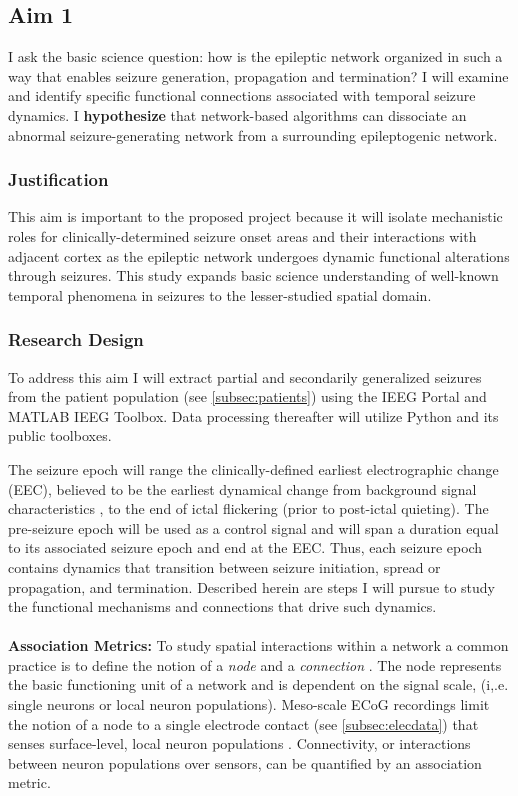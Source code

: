 \subsection{Aim 1}
\label{rsappr:aim1}
I ask the basic science question: how is the epileptic network organized in such a way that enables seizure generation, propagation and termination? I will examine and identify specific functional connections associated with temporal seizure dynamics. I \textbf{hypothesize} that network-based algorithms can dissociate an abnormal seizure-generating network from a surrounding epileptogenic network.

\subsubsection{Justification}
This aim is important to the proposed project because it will isolate mechanistic roles for clinically-determined seizure onset areas and their interactions with adjacent cortex as the epileptic network undergoes dynamic functional alterations through seizures. This study expands basic science understanding of well-known temporal phenomena in seizures to the lesser-studied spatial domain.

\subsubsection{Research Design}
To address this aim I will extract partial and secondarily generalized seizures from the patient population (see \ref{subsec:patients}) using the IEEG Portal and MATLAB IEEG Toolbox. Data processing thereafter will utilize Python and its public toolboxes.

The seizure epoch will range the clinically-defined earliest electrographic change (EEC), believed to be the earliest dynamical change from background signal characteristics \cite{litt2001epileptic}, to the end of ictal flickering (prior to post-ictal quieting). The pre-seizure epoch will be used as a control signal and will span a duration equal to its associated seizure epoch and end at the EEC. Thus, each seizure epoch contains dynamics that transition between seizure initiation, spread or propagation, and termination. Described herein are steps I will pursue to study the functional mechanisms and connections that drive such dynamics.
~\\
~\\
\textbf{Association Metrics:}
To study spatial interactions within a network a common practice is to define the notion of a \textit{node} and a \textit{connection} \cite{bullmore2011brain}. The node represents the basic functioning unit of a network and is dependent on the signal scale, (i,.e. single neurons or local neuron populations). Meso-scale ECoG recordings limit the notion of a node to a single electrode contact (see \ref{subsec:elecdata}) that senses surface-level, local neuron populations \cite{buzsaki2012origin}. Connectivity, or interactions between neuron populations over sensors, can be quantified by an association metric.

